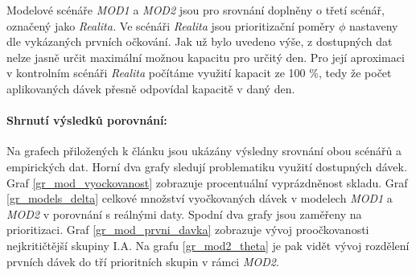 Modelové scénáře \emph{MOD1} a \emph{MOD2} jsou pro srovnání doplněny o třetí scénář, označený jako \emph{Realita.}  Ve scénáři \emph{Realita} jsou prioritizační poměry $\phi$ nastaveny dle vykázaných prvních očkování. Jak už bylo uvedeno výše, z dostupných dat nelze jasně určit maximální možnou kapacitu pro určitý den. Pro její aproximaci v kontrolním scénáři \emph{Realita} počítáme využití kapacit ze 100 \%, tedy že počet aplikovaných dávek přesně odpovídal kapacitě v daný den.




%


\paragraph{Shrnutí výsledků porovnání:} Na grafech přiložených k článku jsou ukázány výsledny srovnání obou scénářů a empirických dat. Horní dva grafy sledují problematiku využití dostupných dávek. Graf \ref{gr_mod_vyockovanost} zobrazuje procentuální vyprázdněnost skladu. Graf \ref{gr_models_delta} celkové množství vyočkovaných dávek v modelech \emph{MOD1} a \emph{MOD2} v porovnání s reálnými daty.
%
Spodní dva grafy jsou zaměřeny na prioritizaci.
Graf \ref{gr_mod_prvni_davka} zobrazuje vývoj proočkovanosti nejkritičtější skupiny I.A. Na grafu  \ref{gr_mod2_theta} je pak vidět vývoj rozdělení prvních dávek do tří prioritních skupin v rámci \emph{MOD2}.


